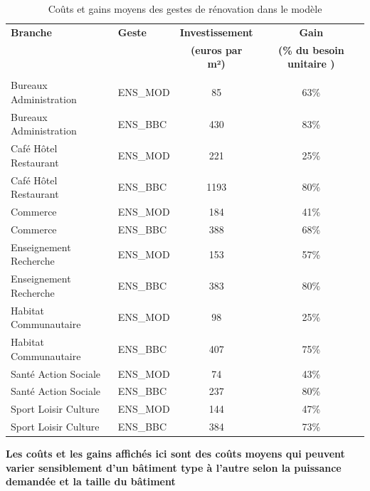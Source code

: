 \documentclass[10.5pt,a4paper]{article}
\begin{document}
{\begin{table}[h!]
\caption{Coûts et gains moyens des gestes de rénovation dans le modèle}
\label{Coutsyst}
\begin{center}
\begin{tabular}{l|l|c|c}
\textbf{Branche} & \textbf{Geste}	&	\textbf{Investissement } & \textbf{Gain } \\
									& & \textbf{(euros par m²)} & \textbf{(\% du besoin unitaire )} \\
									\hline \\
Bureaux Administration &ENS\_MOD   &85 & 63\%\\
Bureaux Administration &ENS\_BBC  &430 &83\%\\
Café Hôtel Restaurant &ENS\_MOD  &221 &25\%\\
Café Hôtel Restaurant& ENS\_BBC &1193 &80\%\\
Commerce& ENS\_MOD  &184 & 41\%\\
Commerce &ENS\_BBC  &388& 68\%\\
Enseignement Recherche &ENS\_MOD  &153 & 57\%\\
Enseignement Recherche &ENS\_BBC  &383 & 80\%\\
Habitat Communautaire &ENS\_MOD   &98 & 25\%\\
Habitat Communautaire &ENS\_BBC  &407 & 75\%\\
Santé Action Sociale &ENS\_MOD   &74 & 43\%\\
Santé Action Sociale &ENS\_BBC  &237 & 80\%\\
Sport Loisir Culture &ENS\_MOD  &144& 47\%\\
Sport Loisir Culture &ENS\_BBC  &384& 73\%\\
\hline	
\end{tabular}
\end{center}
\footnotesize{\textbf{ Les coûts et les gains affichés ici sont des coûts moyens qui peuvent varier sensiblement d'un bâtiment type à l'autre selon la puissance demandée et la taille du bâtiment}}
\end{table}
%
}
\end{document}
